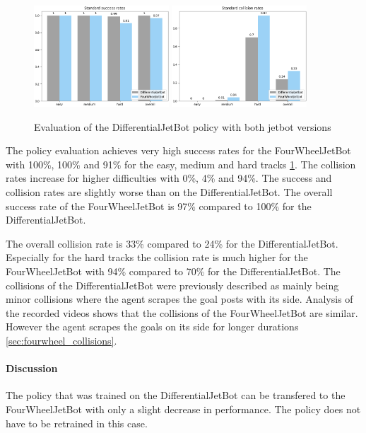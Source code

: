\begin{figure}
    \centering
    \includegraphics[width=0.45\textwidth]{Bilder/notebook_images/hardDistanceMixedLight_eval_jetbot_generalization_success_rates_barplot.png}
    \includegraphics[width=0.45\textwidth]{Bilder/notebook_images/hardDistanceMixedLight_eval_jetbot_generalization_collision_rates_barplot.png}
    \caption{Evaluation of the DifferentialJetBot policy with both jetbot versions}
    \label{fig:result_jetbot_generalization}
\end{figure} %

The policy evaluation achieves very high success rates for the FourWheelJetBot with 100\%, 100\% and 91\% for the easy, medium and hard tracks \ref{fig:result_jetbot_generalization}. The collision rates increase for higher difficulties with 0\%, 4\% and 94\%. 
The success and collision rates are slightly worse than on the DifferentialJetBot. The overall success rate of the FourWheelJetBot is 97\% compared to 100\% for the DifferentialJetBot. 

The overall collision rate is 33\% compared to 24\% for the DifferentialJetBot. Especially for the hard tracks the collision rate is much higher for the FourWheelJetBot with 94\% compared to 70\% for the DifferentialJetBot.
The collisions of the DifferentialJetBot were previously described as mainly being minor collisions where the agent scrapes the goal posts with its side. Analysis of the recorded videos shows that the collisions of the FourWheelJetBot are similar. However the agent scrapes the goals on its side for longer durations \ref{sec:fourwheel_collisions}.


\paragraph{Discussion}

The policy that was trained on the DifferentialJetBot can be transfered to the FourWheelJetBot with only a slight decrease in performance.
The policy does not have to be retrained in this case. 


